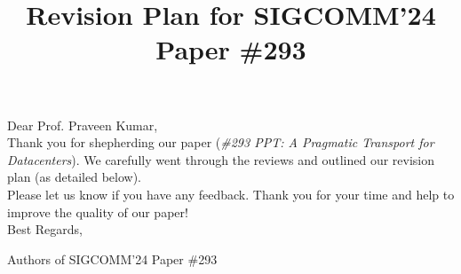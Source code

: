 \documentclass[12pt,one-column]{article}
\begin{document}
\title{Revision Plan for SIGCOMM'24 Paper \#293}
\date{}
\maketitle

\noindent Dear Prof. Praveen Kumar,\\

\noindent Thank you for shepherding our paper (\textit{\#293 PPT: A Pragmatic Transport for Datacenters}). 
We carefully went through the reviews and outlined our revision plan (as detailed below).\\




\noindent Please let us know if you have any feedback. Thank you for your time and help to improve the quality of our paper! \\

\noindent Best Regards,

\noindent Authors of SIGCOMM'24 Paper \#293
\end{document}
